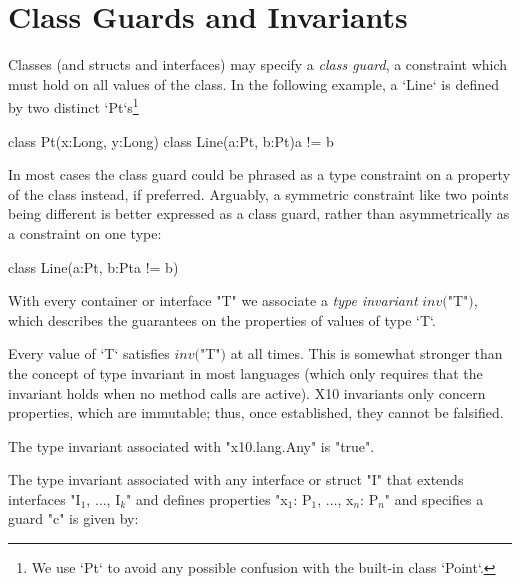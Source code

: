 \section{Class Guards and Invariants}\label{DepType:ClassGuard}


Classes (and structs and interfaces) may specify a {\em class guard}, a
constraint which must hold on all values of the class.    In the following
example, a \xcd`Line` is defined by two distinct \xcd`Pt`s\footnote{We use \xcd`Pt`
to avoid any possible confusion with the built-in class \xcd`Point`.}
\begin{xten}
class Pt(x:Long, y:Long){}
class Line(a:Pt, b:Pt){a != b} {}
\end{xten}
%

In most cases the class guard could be phrased as a type constraint on a property of
the class instead, if preferred.  Arguably, a symmetric constraint like two
points being different is better expressed as a class guard, rather than
asymmetrically as a constraint on one type: 
\begin{xten}
class Line(a:Pt, b:Pt{a != b}) {}
\end{xten}
%



\label{DepType:TypeInvariant}
\label{DepType:ClassGuardDef}



With every container  or interface \xcd"T" we associate a {\em type
invariant} $\mathit{inv}($\xcd"T"$)$, which describes the guarantees on the
properties of values of type \xcd`T`.  

Every value of \xcd`T` satisfies $\mathit{inv}($\xcd"T"$)$ at all times.  This
is somewhat stronger than the concept of type invariant in most languages
(which only requires that the invariant holds when no method calls are
active).  X10 invariants only concern properties, which are immutable; thus,
once established, they cannot be falsified.

The type
invariant associated with \xcd"x10.lang.Any"
is 
\xcd"true".

The type invariant associated with any interface or struct \xcd"I" that extends
interfaces \xcdmath"I$_1$, $\dots$, I$_k$" and defines properties
\xcdmath"x$_1$: P$_1$, $\dots$, x$_n$: P$_n$" and
specifies a guard \xcd"c" is given by:

